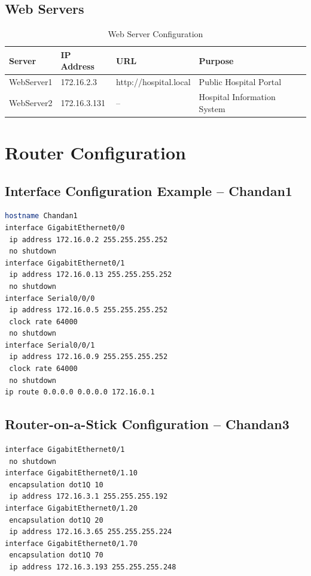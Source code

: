 \documentclass[12pt,a4paper]{report}
\begin{document}
\section{Web Servers}
\begin{table}[H]
\centering
\caption{Web Server Configuration}
\begin{tabular}{llll}
\toprule
\textbf{Server} & \textbf{IP Address} & \textbf{URL} & \textbf{Purpose} \\
\midrule
WebServer1 & 172.16.2.3 & http://hospital.local & Public Hospital Portal \\
WebServer2 & 172.16.3.131 & -- & Hospital Information System \\
\bottomrule
\end{tabular}
\end{table}

\chapter{Router Configuration}

\section{Interface Configuration Example -- Chandan1}
\begin{lstlisting}[caption={Chandan1 Interface Configuration},language=bash]
hostname Chandan1
interface GigabitEthernet0/0
 ip address 172.16.0.2 255.255.255.252
 no shutdown
interface GigabitEthernet0/1
 ip address 172.16.0.13 255.255.255.252
 no shutdown
interface Serial0/0/0
 ip address 172.16.0.5 255.255.255.252
 clock rate 64000
 no shutdown
interface Serial0/0/1
 ip address 172.16.0.9 255.255.255.252
 clock rate 64000
 no shutdown
ip route 0.0.0.0 0.0.0.0 172.16.0.1
\end{lstlisting}

\section{Router-on-a-Stick Configuration -- Chandan3}
\begin{lstlisting}[caption={Chandan3 Subinterface Configuration},language=bash]
interface GigabitEthernet0/1
 no shutdown
interface GigabitEthernet0/1.10
 encapsulation dot1Q 10
 ip address 172.16.3.1 255.255.255.192
interface GigabitEthernet0/1.20
 encapsulation dot1Q 20
 ip address 172.16.3.65 255.255.255.224
interface GigabitEthernet0/1.70
 encapsulation dot1Q 70
 ip address 172.16.3.193 255.255.255.248
\end{lstlisting}
\end{document}

